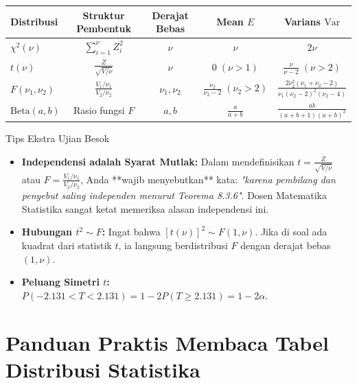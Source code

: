 \documentclass[10pt,twoside]{article}
\begin{document}
\begin{center}
\renewcommand{\arraystretch}{1.35}
\small
\begin{tabular}{lcccc}
\toprule
\textbf{Distribusi} & \textbf{Struktur Pembentuk} & \textbf{Derajat Bebas} & \textbf{Mean $E$} & \textbf{Varians $\mathrm{Var}$} \\
\midrule
$\chi^2(\nu)$ & $\sum_{i=1}^\nu Z_i^2$ & $\nu$ & $\nu$ & $2\nu$ \\
$t(\nu)$ & $\frac{Z}{\sqrt{V/\nu}}$ & $\nu$ & $0 \; (\nu > 1)$ & $\frac{\nu}{\nu - 2} \; (\nu > 2)$ \\
$F(\nu_1, \nu_2)$ & $\frac{V_1/\nu_1}{V_2/\nu_2}$ & $\nu_1, \nu_2$ & $\frac{\nu_2}{\nu_2 - 2} \; (\nu_2 > 2)$ & $\frac{2\nu_2^2(\nu_1+\nu_2-2)}{\nu_1(\nu_2-2)^2(\nu_2-4)}$ \\
$\text{Beta}(a, b)$ & Rasio fungsi $F$ & $a, b$ & $\frac{a}{a+b}$ & $\frac{ab}{(a+b+1)(a+b)^2}$ \\
\bottomrule
\end{tabular}
\end{center}

\vspace{0.2cm}
\begin{warningbox}{Tips Ekstra Ujian Besok}
\begin{itemize}
  \item \textbf{Independensi adalah Syarat Mutlak:} Dalam mendefinisikan $t = \frac{Z}{\sqrt{V/\nu}}$ atau $F = \frac{V_1/\nu_1}{V_2/\nu_2}$, Anda **wajib menyebutkan** kata: \textit{"karena pembilang dan penyebut saling independen menurut Teorema 8.3.6"}. Dosen Matematika Statistika sangat ketat memeriksa alasan independensi ini.
  \item \textbf{Hubungan $t^2 \sim F$:} Ingat bahwa $[t(\nu)]^2 \sim F(1, \nu)$. Jika di soal ada kuadrat dari statistik $t$, ia langsung berdistribusi $F$ dengan derajat bebas $(1, \nu)$.
  \item \textbf{Peluang Simetri $t$:} $P(-2.131 < T < 2.131) = 1 - 2P(T \ge 2.131) = 1 - 2\alpha$.
\end{itemize}
\end{warningbox}

\section{Panduan Praktis Membaca Tabel Distribusi Statistika}
\end{document}

